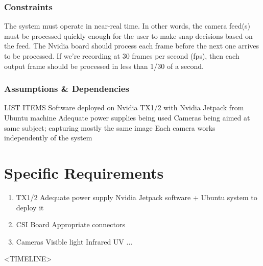 \documentclass[]{report}
\begin{document}
\subsubsection{Constraints}
The system must operate in near-real time. In other words, the camera feed(s) must be processed quickly enough for the user to make snap decisions based on the feed. The Nvidia board should process each frame before the next one arrives to be processed. If we’re recording at 30 frames per second (fps), then each output frame should be processed in less than 1/30 of a second.

\subsubsection{Assumptions \& Dependencies}
LIST ITEMS
Software deployed on Nvidia TX1/2 with Nvidia Jetpack from Ubuntu machine
Adequate power supplies being used
Cameras being aimed at same subject; capturing mostly the same image
Each camera works independently of the system

\section{Specific Requirements}
\begin{enumerate}
	\item TX1/2
		\subitem Adequate power supply
		\subitem Nvidia Jetpack software + Ubuntu system to deploy it
	\item CSI Board
		\subitem Appropriate connectors
	\item Cameras
		\subitem Visible light
		\subitem Infrared
		\subitem UV
		\subitem ...
\end{enumerate}

<TIMELINE>
\end{document}
